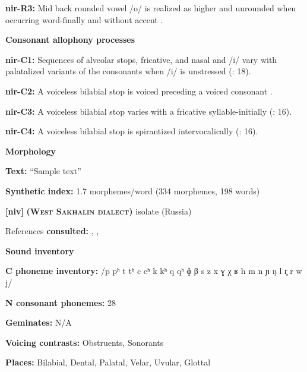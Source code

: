 \textbf{nir-R3:} Mid back rounded vowel /o/ is realized as higher and unrounded when occurring word-finally and without accent \citep[14]{Anceaux1965}.



\textbf{Consonant allophony processes}



\textbf{nir-C1:} Sequences of alveolar stops, fricative, and nasal and /i/ vary with palatalized variants of the consonants when /i/ is unstressed (\citealt{MayMay1981}: 18).



\textbf{nir-C2:} A voiceless bilabial stop is voiced preceding a voiced consonant \citep[30]{May1997}.



\textbf{nir-C3:} A voiceless bilabial stop varies with a fricative syllable-initially (\citealt{MayMay1981}: 16).



\textbf{nir-C4:} A voiceless bilabial stop is spirantized intervocalically (\citealt{MayMay1981}: 16).



\textbf{Morphology}



\textbf{Text:} “Sample text” \citep[172-177]{May1997}



\textbf{Synthetic index:} 1.7 morphemes/word (334 morphemes, 198 words)



\textbf{[niv]}   \textbf{\textsc{ (West Sakhalin dialect)}}  isolate (Russia)



References \textbf{consulted:} \citet{Gruzdeva1998}, \citet{Kreinovich1979}, \citet{Shiraishi2006}



\textbf{Sound inventory}



\textbf{C phoneme inventory:} /p pʰ t tʰ c cʰ k kʰ q qʰ ɸ β s z x ɣ χ ʁ h m n ɲ ŋ l r̥ r w j/



\textbf{N consonant phonemes:} 28



\textbf{Geminates:} N/A



\textbf{Voicing contrasts:} Obstruents, Sonorants



\textbf{Places:} Bilabial, Dental, Palatal, Velar, Uvular, Glottal



